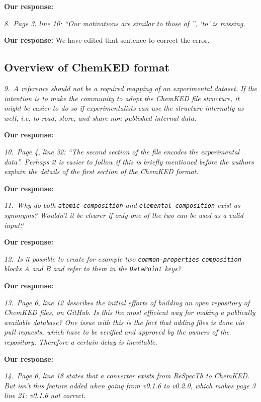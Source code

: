 \documentclass[a4paper,10pt]{elsarticle}
\begin{document}
\textbf{Our response:}


\textit{8.~Page 3, line 10: ``Our motivations are similar to those of '', `to' is missing.}

\textbf{Our response:}
We have edited that sentence to correct the error.


\subsection*{Overview of ChemKED format}

\textit{9.~A reference should not be a required mapping of an experimental dataset. If the intention is to make the community to adopt the ChemKED file structure, it might be easier to do so if experimentalists can use the structure internally as well, i.e. to read, store, and share non-published internal data.}

\textbf{Our response:}

\textit{10.~Page 4, line 32: ``The second section of the file encodes the experimental data''. Perhaps it is easier to follow if this is briefly mentioned before the authors explain the details of the first section of the ChemKED format.}

\textbf{Our response:}

\textit{11.~Why do both \texttt{atomic-composition} and \texttt{elemental-composition} exist as synonyms? Wouldn't it be clearer if only one of the two can be used as a valid input?}

\textbf{Our response:}


\textit{12.~Is it possible to create for example two \texttt{common-properties} \texttt{composition} blocks A and B and refer to them in the \texttt{DataPoint} keys?}

\textbf{Our response:}


\textit{13.~Page 6, line 12 describes the initial efforts of building an open repository of ChemKED files, on GitHub. Is this the most efficient way for making a publically available database? One issue with this is the fact that adding files is done via pull requests, which have to be verified and approved by the owners of the repository. Therefore a certain delay is inevitable.}

\textbf{Our response:}

\textit{14.~Page 6, line 18 states that a converter exists from ReSpecTh to ChemKED. But isn't this feature added when going from v0.1.6 to v0.2.0, which makes page 3 line 21: v0.1.6 not correct.}
\end{document}
